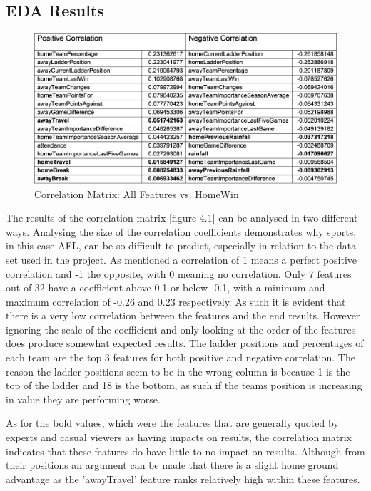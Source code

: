 \documentclass{imc-inf}
\begin{document}
	\subsection{EDA Results}
	\begin{figure}
		\caption{Correlation Matrix: All Features vs. HomeWin}
		\includegraphics[width=15cm]{media/eda_correlation.png}
	\end{figure}
	The results of the correlation matrix [figure 4.1] can be analysed in two different ways. Analysing the size of the correlation coefficients demonstrates why sports, in this case AFL, can be so difficult to predict, especially in relation to the data set used in the project. As mentioned a correlation of 1 means a perfect positive correlation and -1 the opposite, with 0 meaning no correlation. Only 7 features out of 32 have a coefficient above 0.1 or below -0.1, with a minimum and maximum correlation of -0.26 and 0.23 respectively. As such it is evident that there is a very low correlation between the features and the end results. However ignoring the scale of the coefficient and only looking at the order of the features does produce somewhat expected results. The ladder positions and percentages of each team are the top 3 features for both positive and negative correlation. The reason the ladder positions seem to be in the wrong column is because 1 is the top of the ladder and 18 is the bottom, as such if the teams position is increasing in value they are performing worse.
	
	As for the bold values, which were the features that are generally quoted by experts and casual viewers as having impacts on results, the correlation matrix indicates that these features do have little to no impact on results. Although from their positions an argument can be made that there is a slight home ground advantage as the 'awayTravel' feature ranks relatively high within these features. 
	
\end{document}
